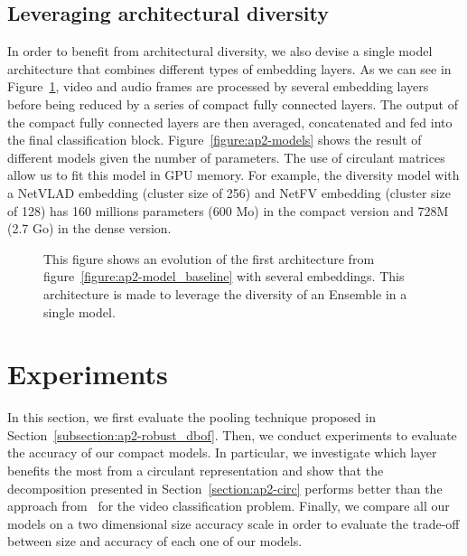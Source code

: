 \subsection{Leveraging architectural diversity}
\label{subsection:ap2-ensemble}

In order to benefit from architectural diversity, we also devise a single model architecture that combines different types of embedding layers.
As we can see in Figure~\ref{figure:ap2-diverstiy_architecture}, video and audio frames are processed by several embedding layers before being reduced by a series of compact fully connected layers.
The output of the compact fully connected layers are then averaged, concatenated and fed into the final classification block.
Figure~\ref{figure:ap2-models} shows the result of different models given the number of parameters.
The use of circulant matrices allow us to fit this model in GPU memory.
For example, the diversity model with a NetVLAD embedding (cluster size of 256) and NetFV embedding (cluster size of 128) has 160 millions parameters (600 Mo) in the compact version and 728M (2.7 Go) in the dense version. 

\begin{figure}[htb]
  \centering
  
  \caption{This figure shows an evolution of the first architecture from figure~\ref{figure:ap2-model_baseline} with several embeddings. This architecture is made to leverage the diversity of an Ensemble in a single model.}
  \label{figure:ap2-diverstiy_architecture}
\end{figure}

\section{Experiments}
\label{section:ap2-xp}

In this section, we first evaluate the pooling technique proposed in Section~\ref{subsection:ap2-robust_dbof}.
Then, we conduct experiments to evaluate the accuracy of our compact models.
In particular, we investigate which layer benefits the most from a circulant representation and show that the decomposition presented in Section~\ref{section:ap2-circ} performs better than the  approach from~\cite{cheng} for the video classification problem.
Finally, we compare all our models on a two dimensional size \vs accuracy scale in order to evaluate the trade-off between size and accuracy of each one of our models. 



